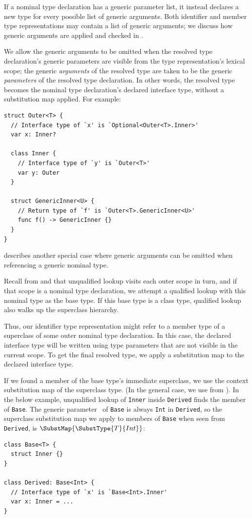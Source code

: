 \documentclass[../generics]{subfiles}
\begin{document}
If a nominal type declaration has a generic parameter list, it instead declares a new type for every possible list of generic arguments. Both identifier and member type representations may contain a list of generic arguments; we discuss how generic arguments are applied and checked in .

We allow the generic arguments to be omitted when the resolved type declaration's generic parameters are visible from the type representation's lexical scope; the generic \emph{arguments} of the resolved type are taken to be the generic \emph{parameters} of the resolved type declaration. In other words, the resolved type becomes the nominal type declaration's declared interface type, without a substitution map applied. For example:
\begin{Verbatim}
struct Outer<T> {
  // Interface type of `x' is `Optional<Outer<T>.Inner>'
  var x: Inner?

  class Inner {
    // Interface type of `y' is `Outer<T>'
    var y: Outer
  }

  struct GenericInner<U> {
    // Return type of `f' is `Outer<T>.GenericInner<U>'
    func f() -> GenericInner {}
  }
}
\end{Verbatim}
 describes another special case where generic arguments can be omitted when referencing a generic nominal type.

Recall from  and  that unqualified lookup visits each outer scope in turn, and if that scope is a nominal type declaration, we attempt a qualified lookup with this nominal type as the base type. If this base type is a class type, qualified lookup also walks up the superclass hierarchy.

Thus, our identifier type representation might refer to a member type of a superclass of some outer nominal type declaration. In this case, the declared interface type will be written using type parameters that are not visible in the current scope. To get the final resolved type, we apply a substitution map to the declared interface type.

If we found a member of the base type's immediate superclass, we use the context substitution map of the superclass type. (In the general case, we use  from ). In the below example, unqualified lookup of \texttt{Inner} inside \texttt{Derived} finds the member of \texttt{Base}. The generic parameter \tT\ of \texttt{Base} is always \texttt{Int} in \texttt{Derived}, so the superclass substitution map we apply to members of \texttt{Base} when seen from \texttt{Derived}, is $\SubstMap{\SubstType{T}{Int}}$:
\begin{Verbatim}
class Base<T> {
  struct Inner {}
}

class Derived: Base<Int> {
  // Interface type of `x' is `Base<Int>.Inner'
  var x: Inner = ...
}
\end{Verbatim}
\end{document}
